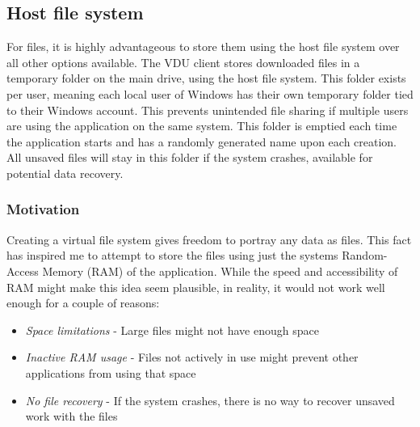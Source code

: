 \subsection{Host file system}
For files, it is highly advantageous to store them using the host file system over all other options available. The VDU client stores downloaded files in a temporary folder on the main drive, using the host file system. This folder exists per user, meaning each local user of Windows has their own temporary folder tied to their Windows account. This prevents unintended file sharing if multiple users are using the application on the same system. This folder is emptied each time the application starts and has a randomly generated name upon each creation. All unsaved files will stay in this folder if the system crashes, available for potential data recovery. 

\subsubsection{Motivation}
Creating a virtual file system gives freedom to portray any data as files. This fact has inspired me to attempt to store the files using just the systems Random-Access Memory (RAM) of the application. While the speed and accessibility of RAM might make this idea seem plausible, in reality, it would not work well enough for a couple of reasons:
\begin{itemize}
    \item \textit{Space limitations} - Large files might not have enough space
    \item \textit{Inactive RAM usage} - Files not actively in use might prevent other applications from using that space
    \item \textit{No file recovery} - If the system crashes, there is no way to recover unsaved work with the files
\end{itemize}

